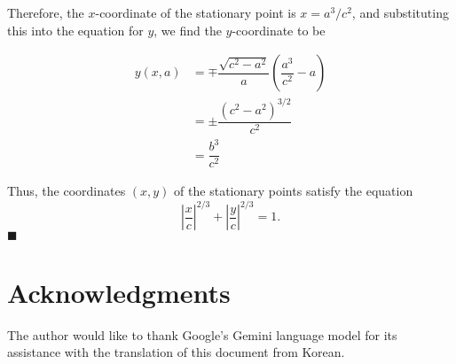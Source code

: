 \documentclass[twocolumn]{article}
\begin{document}
Therefore, the $x$-coordinate of the stationary point is $x = a^3/c^2$, and substituting this into the equation for $y$, we find the $y$-coordinate to be

$$ \begin{aligned}
	y(x, a) &= \mp \dfrac{\sqrt{c^2-a^2}}{a}\left(\dfrac{a^3}{c^2}-a\right)\\
	& = \pm \dfrac{\left( c^2- a^2 \right)^{3/2}}{c^2}\\
	& = \dfrac{b^3}{c^2}
\end{aligned}
$$

Thus, the coordinates $(x, y)$ of the stationary points satisfy the equation
$$ \left|\dfrac{x}{c}\right|^{2/3} + \left|\dfrac{y}{c}\right|^{2/3} = 1. $$
$\blacksquare$

\section*{Acknowledgments}
The author would like to thank Google's Gemini language model for its assistance with the translation of this document from Korean.
\end{document}
